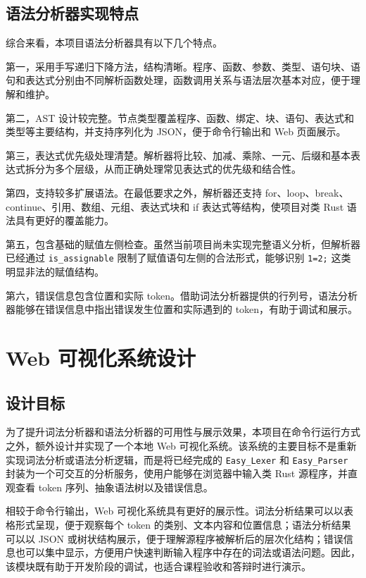 \documentclass[UTF8,a4paper,12pt]{ctexart}
\begin{document}
\subsection{语法分析器实现特点}

综合来看，本项目语法分析器具有以下几个特点。

第一，采用手写递归下降方法，结构清晰。程序、函数、参数、类型、语句块、语句和表达式分别由不同解析函数处理，函数调用关系与语法层次基本对应，便于理解和维护。

第二，AST 设计较完整。节点类型覆盖程序、函数、绑定、块、语句、表达式和类型等主要结构，并支持序列化为 JSON，便于命令行输出和 Web 页面展示。

第三，表达式优先级处理清楚。解析器将比较、加减、乘除、一元、后缀和基本表达式拆分为多个层级，从而正确处理常见表达式的优先级和结合性。

第四，支持较多扩展语法。在最低要求之外，解析器还支持 for、loop、break、continue、引用、数组、元组、表达式块和 if 表达式等结构，使项目对类 Rust 语法具有更好的覆盖能力。

第五，包含基础的赋值左侧检查。虽然当前项目尚未实现完整语义分析，但解析器已经通过 \texttt{is\_assignable} 限制了赋值语句左侧的合法形式，能够识别 \texttt{1=2;} 这类明显非法的赋值结构。

第六，错误信息包含位置和实际 token。借助词法分析器提供的行列号，语法分析器能够在错误信息中指出错误发生位置和实际遇到的 token，有助于调试和展示。

\section{Web 可视化系统设计}

\subsection{设计目标}

为了提升词法分析器和语法分析器的可用性与展示效果，本项目在命令行运行方式之外，额外设计并实现了一个本地 Web 可视化系统。该系统的主要目标不是重新实现词法分析或语法分析逻辑，而是将已经完成的 \texttt{Easy\_Lexer} 和 \texttt{Easy\_Parser} 封装为一个可交互的分析服务，使用户能够在浏览器中输入类 Rust 源程序，并直观查看 token 序列、抽象语法树以及错误信息。

相较于命令行输出，Web 可视化系统具有更好的展示性。词法分析结果可以以表格形式呈现，便于观察每个 token 的类别、文本内容和位置信息；语法分析结果可以以 JSON 或树状结构展示，便于理解源程序被解析后的层次化结构；错误信息也可以集中显示，方便用户快速判断输入程序中存在的词法或语法问题。因此，该模块既有助于开发阶段的调试，也适合课程验收和答辩时进行演示。
\end{document}
